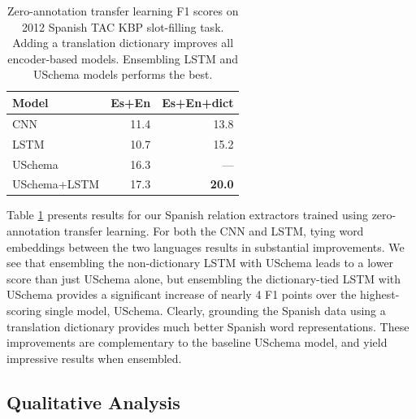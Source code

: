 \begin{table}
\begin{center}
\begin{tabular}{|lrr|}
\hline
\bf Model & \bf Es+En & \bf Es+En+dict  \\
\hline\hline
CNN 		                    & 11.4     & 13.8	\\
LSTM 	                        & 10.7     & 15.2   \\
USchema                         & 16.3     & --- \\
\hline
USchema+LSTM                    & 17.3     & \bf 20.0 \\
\hline
\end{tabular}
\caption{Zero-annotation transfer learning F1 scores on 2012 Spanish TAC KBP slot-filling task. Adding a translation dictionary improves all encoder-based models. Ensembling LSTM and USchema models performs the best. \label{es-tac-table}}
\end{center}
\end{table}

Table \ref{es-tac-table} presents results for our Spanish relation extractors trained using zero-annotation transfer learning. For both the CNN and LSTM, tying word embeddings between the two languages results in substantial improvements. We see that ensembling the non-dictionary LSTM with USchema leads to a lower score than just USchema alone, but ensembling the dictionary-tied LSTM with USchema provides a significant increase of nearly 4 F1 points over the highest-scoring single model, USchema. Clearly, grounding the Spanish data using a translation dictionary provides much better Spanish word representations. These improvements are complementary to the baseline USchema model, and yield impressive results when ensembled. 


\subsection{Qualitative Analysis \label{sec:qual-anal}}

